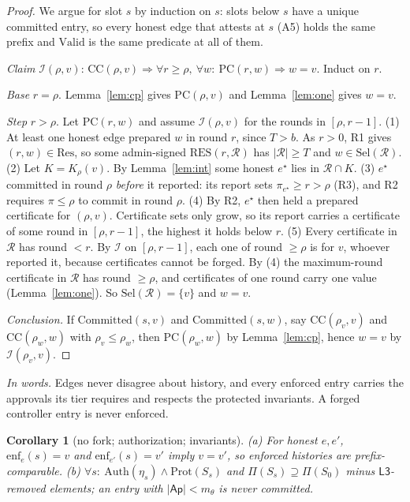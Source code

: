 \documentclass[conference]{IEEEtran}
\newtheorem{corollary}{Corollary}
\newcommand{\Pc}{\mathrm{PC}}
\newcommand{\Cc}{\mathrm{CC}}
\newcommand{\Val}{\mathrm{Valid}}
\newcommand{\Sel}{\mathrm{Sel}}
\newcommand{\Cm}{\mathrm{Committed}}
\newcommand{\words}[1]{\par\noindent\textit{In words.} #1\par\smallskip}
\begin{document}
\begin{proof}
We argue for slot $s$ by induction on $s$: slots below $s$ have a unique committed entry, so every honest edge that attests at $s$ (A5) holds the same prefix and $\Val$ is the same predicate at all of them.

\emph{Claim} $\mathcal I(\rho,v)$: $\Cc(\rho,v)\Rightarrow\forall r\ge\rho,\ \forall w:\ \Pc(r,w)\Rightarrow w=v$. Induct on $r$.

\emph{Base} $r=\rho$. Lemma~\ref{lem:cp} gives $\Pc(\rho,v)$ and Lemma~\ref{lem:one} gives $w=v$.

\emph{Step} $r>\rho$. Let $\Pc(r,w)$ and assume $\mathcal I(\rho,v)$ for the rounds in $[\rho,r-1]$.
(1) At least one honest edge prepared $w$ in round $r$, since $T>b$. As $r>0$, R1 gives $(r,w)\in\mathrm{Res}$, so some admin-signed $\mathrm{RES}(r,\mathcal R)$ has $|\mathcal R|\ge T$ and $w\in\Sel(\mathcal R)$.
(2) Let $K=K_\rho(v)$. By Lemma~\ref{lem:int} some honest $e^\star$ lies in $\mathcal R\cap K$.
(3) $e^\star$ committed in round $\rho$ \emph{before} it reported: its report sets $\pi_{e^\star}\ge r>\rho$ (R3), and R2 requires $\pi\le\rho$ to commit in round $\rho$.
(4) By R2, $e^\star$ then held a prepared certificate for $(\rho,v)$. Certificate sets only grow, so its report carries a certificate of some round in $[\rho,r-1]$, the highest it holds below $r$.
(5) Every certificate in $\mathcal R$ has round $<r$. By $\mathcal I$ on $[\rho,r-1]$, each one of round $\ge\rho$ is for $v$, whoever reported it, because certificates cannot be forged. By (4) the maximum-round certificate in $\mathcal R$ has round $\ge\rho$, and certificates of one round carry one value (Lemma~\ref{lem:one}). So $\Sel(\mathcal R)=\{v\}$ and $w=v$.

\emph{Conclusion.} If $\Cm(s,v)$ and $\Cm(s,w)$, say $\Cc(\rho_v,v)$ and $\Cc(\rho_w,w)$ with $\rho_v\le\rho_w$, then $\Pc(\rho_w,w)$ by Lemma~\ref{lem:cp}, hence $w=v$ by $\mathcal I(\rho_v,v)$.
\end{proof}
\words{Edges never disagree about history, and every enforced entry carries the approvals its tier requires and respects the protected invariants. A forged controller entry is never enforced.}
\begin{corollary}[no fork; authorization; invariants]\label{cor:fork}
(a) For honest $e,e'$, $\mathrm{enf}_e(s)=v$ and $\mathrm{enf}_{e'}(s)=v'$ imply $v=v'$, so enforced histories are prefix-comparable. (b) $\forall s:\ \mathrm{Auth}(\eta_s)\wedge\mathrm{Prot}(S_s)$ and $\Pi(S_s)\supseteq\Pi(S_0)$ minus $\mathsf{L3}$-removed elements; an entry with $|\mathsf{Ap}|<m_\theta$ is never committed.
\end{corollary}
\end{document}
